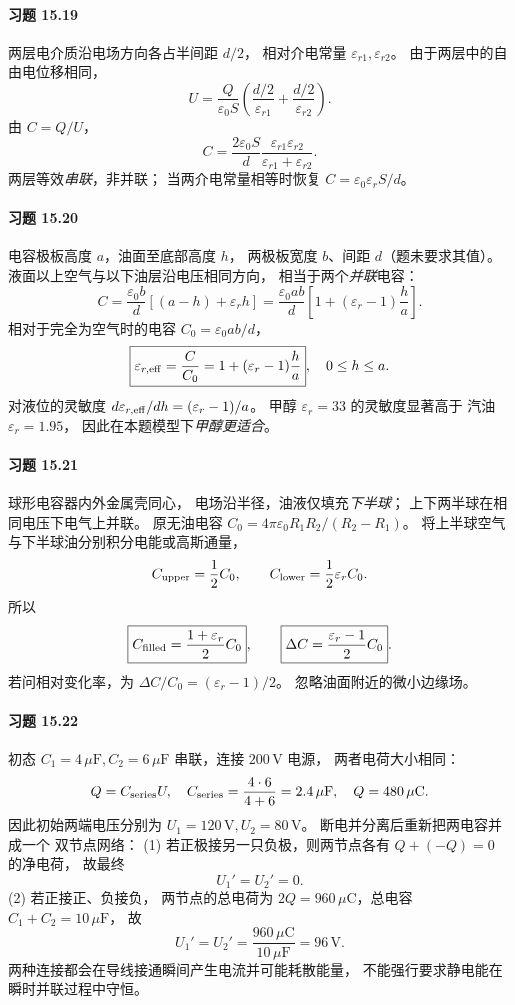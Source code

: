 \paragraph{习题 15.19}
两层电介质沿电场方向各占半间距 \(d/2\)，
相对介电常量
\(\varepsilon_{r1},\varepsilon_{r2}\)。
由于两层中的自由电位移相同，
\[
 U=\frac Q{\varepsilon_0S}
 \left(\frac{d/2}{\varepsilon_{r1}}
 +\frac{d/2}{\varepsilon_{r2}}\right).
\]
由 \(C=Q/U\)，
\[
 \boxed{C=\frac{2\varepsilon_0S}{d}
 \frac{\varepsilon_{r1}\varepsilon_{r2}}
 {\varepsilon_{r1}+\varepsilon_{r2}}}.
\]
两层等效\emph{串联}，非并联；
当两介电常量相等时恢复
\(C=\varepsilon_0\varepsilon_rS/d\)。

\paragraph{习题 15.20}
电容极板高度 \(a\)，油面至底部高度 \(h\)，
两极板宽度 \(b\)、间距 \(d\)（题未要求其值）。
液面以上空气与以下油层沿电压相同方向，
相当于两个\emph{并联}电容：
\[
 C=\frac{\varepsilon_0 b}{d}
 [(a-h)+\varepsilon_r h]
 =\frac{\varepsilon_0ab}{d}
 \left[1+(\varepsilon_r-1)\frac ha\right].
\]
相对于完全为空气时的电容
\(C_0=\varepsilon_0ab/d\)，
\[
 \boxed{\varepsilon_{r,\rm eff}
 =\frac C{C_0}
 =1+(\varepsilon_r-1)\frac ha},\quad 0\le h\le a.
\]
对液位的灵敏度
\(d\varepsilon_{r,\rm eff}/dh
 =(\varepsilon_r-1)/a\)。
甲醇 \(\varepsilon_r=33\)
的灵敏度显著高于
汽油 \(\varepsilon_r=1.95\)，
因此在本题模型下\emph{甲醇更适合}。

\paragraph{习题 15.21}
球形电容器内外金属壳同心，
电场沿半径，油液仅填充\emph{下半球}；
上下两半球在相同电压下电气上并联。
原无油电容
\(C_0=4\pi\varepsilon_0 R_1R_2/(R_2-R_1)\)。
将上半球空气与下半球油分别积分电能或高斯通量，
\[
 C_{\rm upper}=\frac12C_0,\qquad
 C_{\rm lower}=\frac12\varepsilon_r C_0.
\]
所以
\[
 \boxed{C_{\rm filled}=\frac{1+\varepsilon_r}{2}C_0},\qquad
 \boxed{\Delta C=\frac{\varepsilon_r-1}{2}C_0}.
\]
若问相对变化率，为
\(\Delta C/C_0=(\varepsilon_r-1)/2\)。
忽略油面附近的微小边缘场。

\paragraph{习题 15.22}
初态 \(C_1=4\,\mu\mathrm F,C_2=6\,\mu\mathrm F\)
串联，连接 \(200\,\mathrm V\) 电源，
两者电荷大小相同：
\[
 Q=C_{\rm series}U,\quad
 C_{\rm series}=\frac{4\cdot6}{4+6}=2.4\,\mu\mathrm F,\quad
 Q=480\,\mu\mathrm C.
\]
因此初始两端电压分别为
\(U_1=120\,\mathrm V,U_2=80\,\mathrm V\)。
断电并分离后重新把两电容并成一个
双节点网络：
(1) 若正极接另一只负极，则两节点各有
\(Q+(-Q)=0\) 的净电荷，
故最终
\[
 \boxed{U_1'=U_2'=0}.
\]
(2) 若正接正、负接负，
两节点的总电荷为
\(2Q=960\,\mu\mathrm C\)，总电容
\(C_1+C_2=10\,\mu\mathrm F\)，
故
\[
 \boxed{U_1'=U_2'=\frac{960\,\mu\mathrm C}
 {10\,\mu\mathrm F}=96\,\mathrm V}.
\]
两种连接都会在导线接通瞬间产生电流并可能耗散能量，
不能强行要求静电能在瞬时并联过程中守恒。

